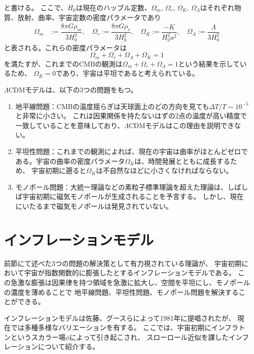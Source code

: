 \documentclass[../../main.tex]{subfiles}
\begin{document}
と書ける。
ここで、$H_0$は現在のハッブル定数、$\Omega_m,\,\Omega_r,\,\Omega_{K},\,\Omega_{\Lambda}$はそれぞれ物質、放射、曲率、宇宙定数の密度パラメータであり
\begin{align}
    \label{eq:omega}
    \Omega_m&:=\dfrac{8\pi G\rho_{m}}{3H_0^2},\quad
    \Omega_r:=\dfrac{8\pi G\rho_{r}}{3H_0^2},\quad
    \Omega_{K}:=\dfrac{-K}{H_0^2a^2},\quad
    \Omega_{\Lambda}:=\dfrac{\Lambda}{3H_0^2}
\end{align}
と表される。これらの密度パラメータは
\begin{equation}
    \label{eq:omegaconstraint}
    \Omega_{m}+\Omega_{r}+\Omega_{\Lambda}+\Omega_{K}=1
\end{equation}
を満たすが、これまでのCMBの観測は$\Omega_{m}+\Omega_{r}+\Omega_{\Lambda}=1$という結果を示しているため、
$\Omega_{K}=0$であり、宇宙は平坦であると考えられている\cite{Bennett_2003}。

$\Lambda\mathrm{CDM}$モデルは、以下の3つの問題をもつ。
\begin{enumerate}
    \item 地平線問題：CMBの温度揺らぎは天球面上のどの方向を見ても$\Delta T/T\sim 10^{-5}$と非常に小さい。
    これは因果関係を持たないはずの2点の温度が高い精度で一致していることを意味しており、$\Lambda\mathrm{CDM}$モデルはこの理由を説明できない。
    \item 平坦性問題：これまでの観測によれば、現在の宇宙は曲率がほとんどゼロである。宇宙の曲率の密度パラメータ$\Omega_{K}$は、時間発展とともに成長するため、
    宇宙初期に遡ると$\Omega_{K}$は不自然なほどに小さくなければならない。
    \item モノポール問題：大統一理論などの素粒子標準理論を超えた理論は、しばしば宇宙初期に磁気モノポールが生成されることを予言する。
    しかし、現在にいたるまで磁気モノポールは発見されていない。
\end{enumerate}
\section{インフレーションモデル}
前節にて述べた3つの問題の解決策として有力視されている理論が、
宇宙初期において宇宙が指数関数的に膨張したとするインフレーションモデルである。
この急激な膨張は因果律を持つ領域を急激に拡大し、空間を平坦にし、モノポールの濃度を薄めることで
地平線問題、平坦性問題、モノポール問題を解決することができる。

インフレーションモデルは佐藤、グースらによって1981年に提唱された\cite{10.1093/mnras/195.3.467}\cite{PhysRevD.23.347}が、
現在では多種多様なバリエーションを有する\cite{Tsujikawa_book}。
ここでは、宇宙初期にインフラトンというスカラー場$\phi$によって引き起こされ、
スローロール近似を課したインフレーションについて紹介する。
\end{document}
